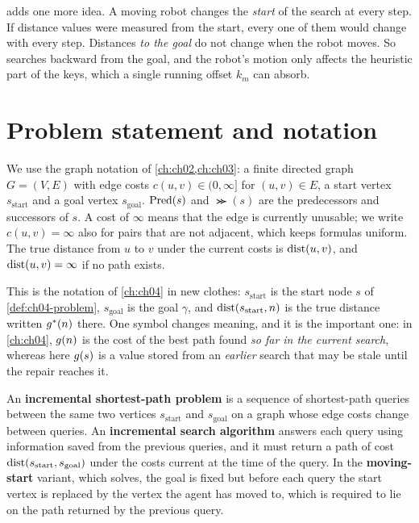 \dstarlite adds one more idea. A moving robot changes the \emph{start} of the search at
every step. If distance values were measured from the start, every one of them would
change with every step. Distances \emph{to the goal} do not change when the robot moves.
So \dstarlite searches backward from the goal, and the robot's motion only affects the
heuristic part of the keys, which a single running offset $k_m$ can absorb.

\section{Problem statement and notation}
\label{sec:ch05-problem}

We use the graph notation of \cref{ch:ch02,ch:ch03}: a finite directed graph $G=(V,E)$
with edge costs $c(u,v) \in (0,\infty]$ for $(u,v)\in E$, a start vertex
$s_{\mathrm{start}}$ and a goal vertex $s_{\mathrm{goal}}$. $\operatorname{Pred}(s)$ and $\Succ(s)$
are the predecessors and successors of $s$. A cost of $\infty$ means that the edge is
currently unusable; we write $c(u,v)=\infty$ also for pairs that are not adjacent, which
keeps formulas uniform. The true distance from $u$ to $v$ under the current costs is
$\operatorname{dist}(u,v)$, and $\operatorname{dist}(u,v)=\infty$ if no path exists.

This is the notation of \cref{ch:ch04} in new clothes: $s_{\mathrm{start}}$ is the start
node $s$ of \cref{def:ch04-problem}, $s_{\mathrm{goal}}$ is the goal $\gamma$, and
$\operatorname{dist}(s_{\mathrm{start}},n)$ is the true distance written $g^*(n)$ there. One
symbol changes meaning, and it is the important one: in \cref{ch:ch04}, $g(n)$ is
the cost of the best path found \emph{so far in the current search}, whereas here
$g(s)$ is a value stored from an \emph{earlier} search that may be stale until the
repair reaches it.

\begin{definition}
\label{def:ch05-problem}
An \textbf{incremental shortest-path problem} is a sequence of shortest-path queries between the same two vertices
$s_{\mathrm{start}}$ and $s_{\mathrm{goal}}$ on a graph whose edge costs change between
queries. An \textbf{incremental search algorithm} answers each query using information
saved from the previous queries, and it must return a path of cost
$\operatorname{dist}(s_{\mathrm{start}}, s_{\mathrm{goal}})$ under the costs current at the time of
the query. In the \textbf{moving-start} variant,
which \dstarlite solves, the goal is fixed but before each query the start vertex is
replaced by the vertex the agent has moved to, which is required to lie on the path
returned by the previous query.
\end{definition}

